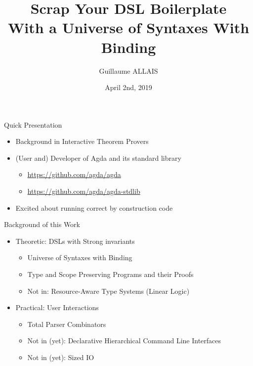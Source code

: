 \documentclass{beamer}
\begin{document}
\author{Guillaume ALLAIS}
\title{Scrap Your DSL Boilerplate\\
With a Universe of Syntaxes With Binding}
\date{April 2nd, 2019}

\begin{frame}
\maketitle
\end{frame}

\begin{frame}{Quick Presentation}
\begin{itemize}
  \item Background in Interactive Theorem Provers
  \item (User and) Developer of Agda and its standard library
    \begin{itemize}
      \item \url{https://github.com/agda/agda}
      \item \url{https://github.com/agda/agda-stdlib}
    \end{itemize}
  \item Excited about running correct by construction code
\end{itemize}
\end{frame}

\begin{frame}{Background of this Work}

\begin{itemize}
  \item Theoretic: DSLs with Strong invariants
    {
    \begin{itemize}
      \item Universe of Syntaxes with Binding
      \item Type and Scope Preserving Programs and their Proofs
      \item Not in: Resource-Aware Type Systems (Linear Logic)
    \end{itemize}
    }
  \medskip
  \item Practical: User Interactions
    {
    \begin{itemize}
      \item Total Parser Combinators
      \item Not in (yet): Declarative Hierarchical Command Line Interfaces
      \item Not in (yet): Sized IO
    \end{itemize}
    }
\end{itemize}
\end{frame}
\end{document}

